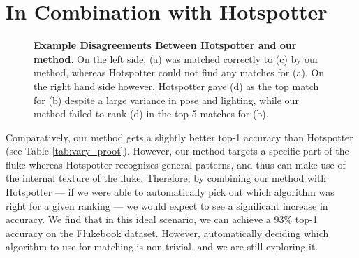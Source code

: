 



\section{In Combination with Hotspotter}

\begin{figure}[t]%
\centering
{}
\newline
{}
\caption{\textbf{Example Disagreements Between Hotspotter and our method}. On the left side, (a) was matched correctly to (c) by our method, whereas Hotspotter could not find any matches for (a). On the right hand side however, Hotspotter gave (d) as the top match for (b) despite a large variance in pose and lighting, while our method failed to rank (d) in the top 5 matches for (b).}
\label{fig:dis_proot}
\end{figure}

Comparatively, our method gets a slightly better top-1 accuracy than Hotspotter (see Table \ref{tab:vary_proot}).
However, our method targets a specific part of the fluke whereas Hotspotter recognizes general patterns, and thus can make use of the internal texture of the fluke.
Therefore, by combining our method with Hotspotter --- if we were able to automatically pick out which algorithm was right for a given ranking --- we would expect to see a significant increase in accuracy.
We find that in this ideal scenario, we can achieve a 93\% top-1 accuracy on the Flukebook dataset.
However, automatically deciding which algorithm to use for matching is non-trivial, and we are still exploring it.

